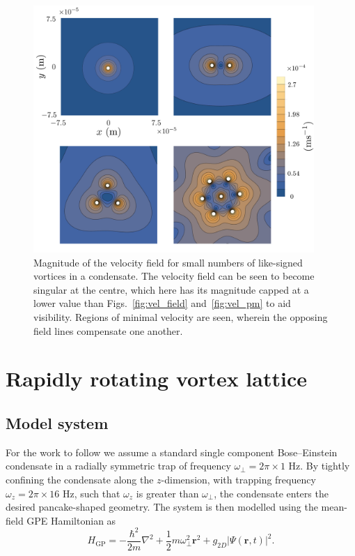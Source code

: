 \begin{figure}\centering
    \includegraphics[width=0.95\textwidth]{Images/ch4_vtx/velocity/vel.png}
    \caption{Magnitude of the velocity field for small numbers of like-signed vortices in a condensate. The velocity field can be seen to become singular at the centre, which here has its magnitude capped at a lower value than Figs.~\ref{fig:vel_field} and~\ref{fig:vel_pm} to aid visibility. Regions of minimal velocity are seen, wherein the opposing field lines compensate one another.}
    \label{fig:vel_pm_contour}
\end{figure}


\section{Rapidly rotating vortex lattice}

\subsection{Model system}\label{sec:modelsystem}
For the work to follow we assume a standard single component Bose--Einstein condensate in a radially symmetric trap of frequency $\omega_\perp = 2\pi \times 1$ Hz. By tightly confining the condensate along the $z$-dimension, with trapping frequency $\omega_z = 2\pi\times 16$ Hz, such that $\omega_z $ is greater than $ \omega_\perp$, the condensate enters the desired pancake-shaped geometry. The system is then modelled using the mean-field GPE Hamiltonian as
\begin{equation}\label{eqn:gpe_h0}
	H_{\mathrm{GP}} = -\frac{\hbar^2}{2m}\nabla^2 + \frac{1}{2}m\omega_{\perp}^2\mathbf{r}^2 + g_{2D}\vert\Psi(\mathbf{r},t)\vert^2.
\end{equation}


